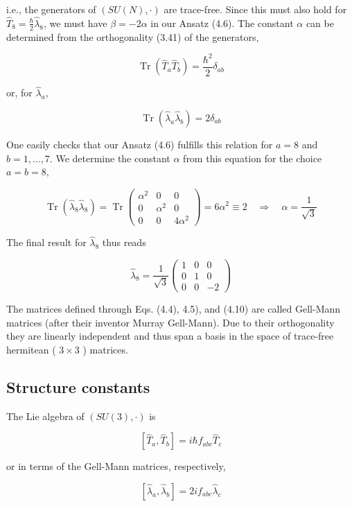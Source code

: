 \documentclass[10pt, letterpaper]{article}
\begin{document}
i.e., the generators of $(S U(N), \cdot)$ are trace-free. Since this must also hold for $\hat{T}_{8}=\frac{\hbar}{2} \hat{\lambda}_{8}$, we must have $\beta=-2 \alpha$ in our Ansatz (4.6). The constant $\alpha$ can be determined from the orthogonality (3.41) of the generators,

$$
\operatorname{Tr}\left(\hat{T}_{a} \hat{T}_{b}\right)=\frac{\hbar^{2}}{2} \delta_{a b}
$$

or, for $\hat{\lambda}_{a}$,

$$
\operatorname{Tr}\left(\hat{\lambda}_{a} \hat{\lambda}_{b}\right)=2 \delta_{a b}
$$

One easily checks that our Ansatz (4.6) fulfills this relation for $a=8$ and $b=1, \ldots, 7$. We determine the constant $\alpha$ from this equation for the choice $a=b=8$,

$$
\operatorname{Tr}\left(\hat{\lambda}_{8} \hat{\lambda}_{8}\right)=\operatorname{Tr}\left(\begin{array}{ccc}
\alpha^{2} & 0 & 0 \\
0 & \alpha^{2} & 0 \\
0 & 0 & 4 \alpha^{2}
\end{array}\right)=6 \alpha^{2} \equiv 2 \quad \Longrightarrow \quad \alpha=\frac{1}{\sqrt{3}}
$$

The final result for $\hat{\lambda}_{8}$ thus reads

$$
\hat{\lambda}_{8}=\frac{1}{\sqrt{3}}\left(\begin{array}{ccc}
1 & 0 & 0 \\
0 & 1 & 0 \\
0 & 0 & -2
\end{array}\right)
$$

The matrices defined through Eqs. (4.4), 4.5), and (4.10) are called Gell-Mann matrices (after their inventor Murray Gell-Mann). Due to their orthogonality they are linearly independent and thus span a basis in the space of trace-free hermitean ( $3 \times 3$ ) matrices.

\subsection{Structure constants}
The Lie algebra of $(S U(3), \cdot)$ is

$$
\left[\hat{T}_{a}, \hat{T}_{b}\right]=i \hbar f_{a b c} \hat{T}_{c}
$$

or in terms of the Gell-Mann matrices, respectively,

$$
\left[\hat{\lambda}_{a}, \hat{\lambda}_{b}\right]=2 i f_{a b c} \hat{\lambda}_{c}
$$
\end{document}
